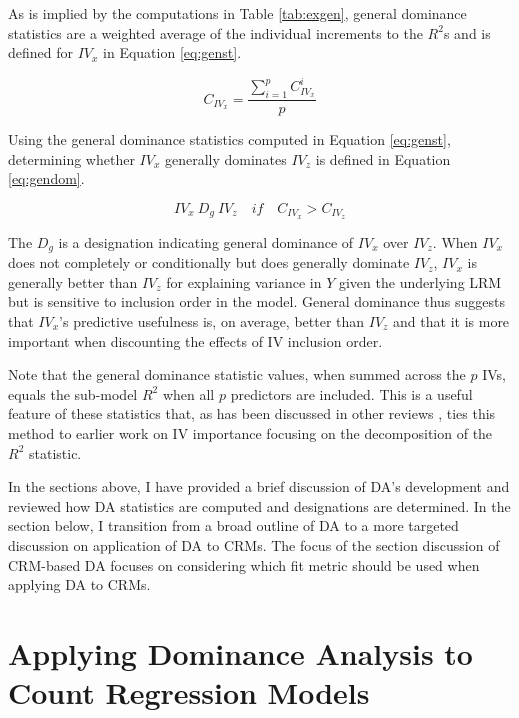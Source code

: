\documentclass[man]{apa7}
\begin{document}
	As is implied by the computations in Table \ref{tab:exgen}, general dominance statistics are a weighted average of the individual increments to the $R^2$s and is defined for $IV_x$ in Equation \ref{eq:genst}.
	
	\begin{equation}
		C_{IV_x} = \frac{\sum^{p}_{i=1} C^i_{IV_x}}{p}
		\label{eq:genst}
	\end{equation}
	
	Using the general dominance statistics computed in Equation \ref{eq:genst}, determining whether $IV_x$ generally dominates $IV_z$ is defined in Equation \ref{eq:gendom}.
	
	\begin{equation}
		IV_x \ D_g \ IV_z \quad if \quad C_{IV_x} > C_{IV_z}
		\label{eq:gendom}
	\end{equation}
	
	The $D_g$ is a designation indicating general dominance of $IV_x$ over $IV_z$.	
	When $IV_x$ does not completely or conditionally but does generally dominate $IV_z$, $IV_x$ is generally better than $IV_z$ for explaining variance in $Y$ given the underlying LRM but is sensitive to inclusion order in the model.
	General dominance thus suggests that $IV_x$'s predictive usefulness is, on average, better than $IV_z$ and that it is more important when discounting the effects of IV inclusion order.
	
	Note that the  general dominance statistic values, when summed across the $p$ IVs, equals the sub-model $R^2$ when all $p$ predictors are included.
	This is a useful feature of these statistics that, as has been discussed in other reviews \parencite{gromping2007estimators,johnson2004history}, ties this method to earlier work on IV importance focusing on the decomposition of the $R^2$ statistic.

	In the sections above, I have provided a brief discussion of DA's development and reviewed how DA statistics are computed and designations are determined.
	In the section below, I transition from a broad outline of DA to a more targeted discussion on application of DA to CRMs.
	The focus of the section discussion of CRM-based DA focuses on considering which fit metric should be used when applying DA to CRMs.
	
\section{Applying Dominance Analysis to Count Regression Models}
\end{document}
